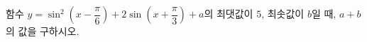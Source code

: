 함수 $y=\sin^2\left(x-\dfrac{\pi}{6}\right)+2\sin\left(x+\dfrac{\pi}{3}\right)+a$의 최댓값이 $5$, 최솟값이 $b$일 때, $a+b$의 값을 구하시오. 
